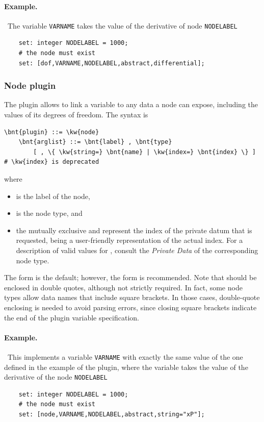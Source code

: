 \paragraph{Example.} \
The variable \texttt{VARNAME} takes the value of the derivative
of  node \texttt{NODELABEL}
\begin{verbatim}
    set: integer NODELABEL = 1000;
    # the node must exist
    set: [dof,VARNAME,NODELABEL,abstract,differential];
\end{verbatim}



\subsubsection{Node plugin}
The  plugin allows to link a variable to any data a node
can expose, including the values of its degrees of freedom.
The syntax is
\begin{Verbatim}[commandchars=\\\{\}]
    \bnt{plugin} ::= \kw{node}
    \bnt{arglist} ::= \bnt{label} , \bnt{type}
        [ , \{ \kw{string=} \bnt{name} | \kw{index=} \bnt{index} \} ] # \kw{index} is deprecated
\end{Verbatim}
where
\begin{itemize}
\item {} is the label of the node,
\item {} is the node type, and
\item the mutually exclusive  and  represent the index
of the private datum that is requested, \nt{name} being a user-friendly
representation of the actual index.
For a description of valid values for , consult the \emph{Private Data} of the corresponding node type.
\end{itemize}
The  form is the default; however, the  form is recommended.
Note that \nt{name} should be enclosed in double quotes,
although not strictly required.
In fact, some node types allow data names that include square brackets.
In those cases, double-quote enclosing is needed to avoid parsing errors,
since closing square brackets indicate the end
of the plugin variable specification.

\paragraph{Example.} \
This implements a variable \texttt{VARNAME} with exactly the same value
of the one defined in the example of the  plugin,
where the variable takes the value of the derivative
of the \kw{abstract} node \texttt{NODELABEL}
\begin{verbatim}
    set: integer NODELABEL = 1000;
    # the node must exist
    set: [node,VARNAME,NODELABEL,abstract,string="xP"];
\end{verbatim}



